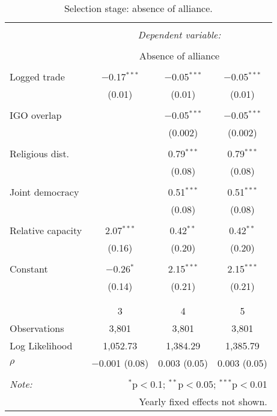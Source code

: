 \documentclass[10pt,]{article}
\begin{document}
\newpage

\begin{table}[!htbp] \centering 
  \caption{\label{tab:AllyTableSelect}Selection stage: absence of alliance.} 
  \label{} 
\begin{tabular}{@{\extracolsep{5pt}}lccc} 
\\[-1.8ex]\hline 
\hline \\[-1.8ex] 
 & \multicolumn{3}{c}{\textit{Dependent variable:}} \\ 
\cline{2-4} 
\\[-1.8ex] & \multicolumn{3}{c}{Absence of alliance} \\ 
\hline \\[-1.8ex] 
 Logged trade & $-$0.17$^{***}$ & $-$0.05$^{***}$ & $-$0.05$^{***}$ \\ 
  & (0.01) & (0.01) & (0.01) \\ 
  & & & \\ 
 IGO overlap &  & $-$0.05$^{***}$ & $-$0.05$^{***}$ \\ 
  &  & (0.002) & (0.002) \\ 
  & & & \\ 
 Religious dist. &  & 0.79$^{***}$ & 0.79$^{***}$ \\ 
  &  & (0.08) & (0.08) \\ 
  & & & \\ 
 Joint democracy &  & 0.51$^{***}$ & 0.51$^{***}$ \\ 
  &  & (0.08) & (0.08) \\ 
  & & & \\ 
 Relative capacity & 2.07$^{***}$ & 0.42$^{**}$ & 0.42$^{**}$ \\ 
  & (0.16) & (0.20) & (0.20) \\ 
  & & & \\ 
 Constant & $-$0.26$^{*}$ & 2.15$^{***}$ & 2.15$^{***}$ \\ 
  & (0.14) & (0.21) & (0.21) \\ 
  & & & \\ 
\hline \\[-1.8ex] 
 & 3 & 4 & 5 \\ 
Observations & 3,801 & 3,801 & 3,801 \\ 
Log Likelihood & 1,052.73 & 1,384.29 & 1,385.79 \\ 
$\rho$ & $-$0.001  (0.08) & 0.003  (0.05) & 0.003  (0.05) \\ 
\hline 
\hline \\[-1.8ex] 
\textit{Note:}  & \multicolumn{3}{r}{$^{*}$p$<$0.1; $^{**}$p$<$0.05; $^{***}$p$<$0.01} \\ 
 & \multicolumn{3}{r}{Yearly fixed effects not shown.} \\ 
\end{tabular} 
\end{table}
\end{document}
